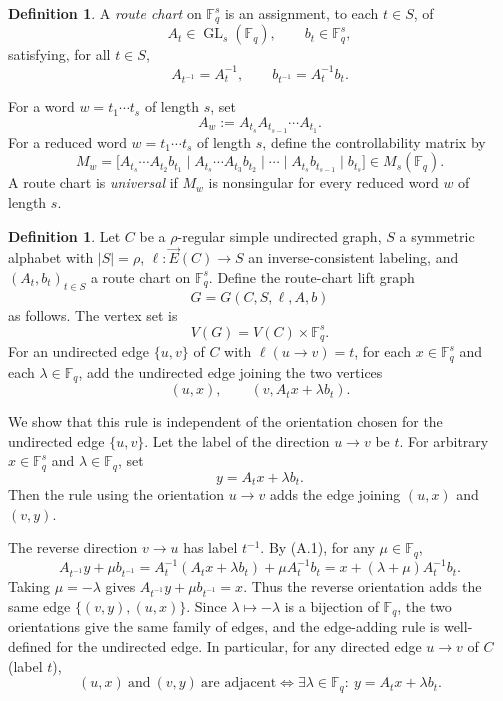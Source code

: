 \documentclass[11pt]{article}
\theoremstyle{definition}
\newtheorem{definition}[theorem]{Definition}
\theoremstyle{remark}
\renewcommand{\_}{\textunderscore\allowbreak}
\begin{document}
\begin{definition}\label{def:chart}
A \emph{route chart} on \(\mathbb F_q^s\) is an
assignment, to each \(t\in S\), of \[
  A_t\in\operatorname{GL}_s(\mathbb F_q),
  \qquad
  b_t\in\mathbb F_q^s ,
\] satisfying, for all \(t\in S\), \[
  A_{t^{-1}}=A_t^{-1},
  \qquad
  b_{t^{-1}}=A_t^{-1}b_t .
  \tag{A.1}
\]

For a word \(w=t_1\cdots t_s\) of length \(s\), set \[
  A_w:=A_{t_s}A_{t_{s-1}}\cdots A_{t_1} .
\] For a reduced word \(w=t_1\cdots t_s\) of length \(s\), define the
controllability matrix by \[
  M_w=
  \bigl[
  A_{t_s}\cdots A_{t_2}b_{t_1}\mid
  A_{t_s}\cdots A_{t_3}b_{t_2}\mid
  \cdots\mid
  A_{t_s}b_{t_{s-1}}\mid
  b_{t_s}
  \bigr]
  \in M_s(\mathbb F_q) .
  \tag{A.2}
\] A route chart is \emph{universal} if \(M_w\) is nonsingular for every
reduced word \(w\) of length \(s\).
\end{definition}

\begin{definition}\label{def:lift}
Let \(C\) be a \(\rho\)-regular simple
undirected graph, \(S\) a symmetric alphabet with \(|S|=\rho\),
\(\ell:\overrightarrow E(C)\to S\) an inverse-consistent labeling, and
\((A_t,b_t)_{t\in S}\) a route chart on \(\mathbb F_q^s\). Define the
route-chart lift graph \[
  G=G(C,S,\ell,A,b)
\] as follows. The vertex set is \[
  V(G)=V(C)\times\mathbb F_q^s .
\] For an undirected edge \(\{u,v\}\) of \(C\) with \(\ell(u\to v)=t\),
for each \(x\in\mathbb F_q^s\) and each \(\lambda\in\mathbb F_q\), add
the undirected edge joining the two vertices \[
  (u,x),\qquad (v,A_tx+\lambda b_t) .
\]
\end{definition}

We show that this rule is independent of the orientation chosen for the
undirected edge \(\{u,v\}\). Let the label of the direction \(u\to v\)
be \(t\). For arbitrary \(x\in\mathbb F_q^s\) and
\(\lambda\in\mathbb F_q\), set \[
  y=A_tx+\lambda b_t .
\] Then the rule using the orientation \(u\to v\) adds the edge joining
\((u,x)\) and \((v,y)\).

The reverse direction \(v\to u\) has label \(t^{-1}\). By (A.1), for any
\(\mu\in\mathbb F_q\), \[
  A_{t^{-1}}y+\mu b_{t^{-1}}
  =A_t^{-1}(A_tx+\lambda b_t)+\mu A_t^{-1}b_t
  =x+(\lambda+\mu)A_t^{-1}b_t .
\] Taking \(\mu=-\lambda\) gives \(A_{t^{-1}}y+\mu b_{t^{-1}}=x\). Thus
the reverse orientation adds the same edge \(\{(v,y),(u,x)\}\). Since
\(\lambda\mapsto-\lambda\) is a bijection of \(\mathbb F_q\), the two
orientations give the same family of edges, and the edge-adding rule is
well-defined for the undirected edge. In particular, for any directed
edge \(u\to v\) of \(C\) (label \(t\)), \[
  (u,x)\ \text{and}\ (v,y)\ \text{are adjacent}
  \iff
  \exists\lambda\in\mathbb F_q:\ y=A_tx+\lambda b_t .
\]
\end{document}
